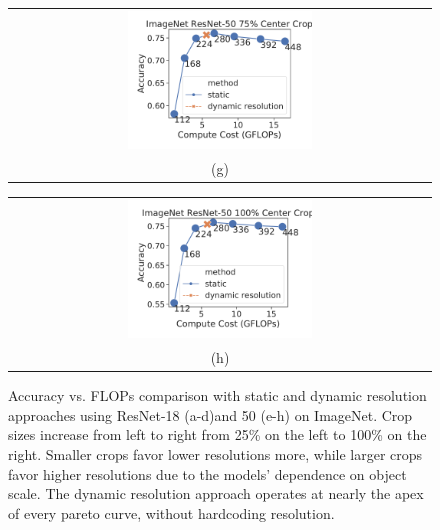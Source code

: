 \begin{figure}[t]
\begin{tabular}{@{}c@{}}
    \includegraphics[width=0.45\textwidth]{e2e_figures/imagenet_resnet50_default_center.pdf} \\
    \small (g)
    \end{tabular}
    \begin{tabular}{@{}c@{}}
    \includegraphics[width=0.45\textwidth]{e2e_figures/imagenet_resnet50_full_center.pdf} \\
    \small (h)
    \end{tabular}
    \caption{Accuracy vs. FLOPs comparison with static and dynamic resolution approaches using ResNet-18 (a-d)and 50 (e-h) on ImageNet. Crop sizes increase from left to right from 25\% on the left to 100\% on the right. Smaller crops favor lower resolutions more, while larger crops favor higher resolutions due to the models' dependence on object scale. The dynamic resolution approach operates at nearly the apex of every pareto curve, without hardcoding resolution.}
    \label{fig:accflops_resnet_imagenet}
\end{figure}
